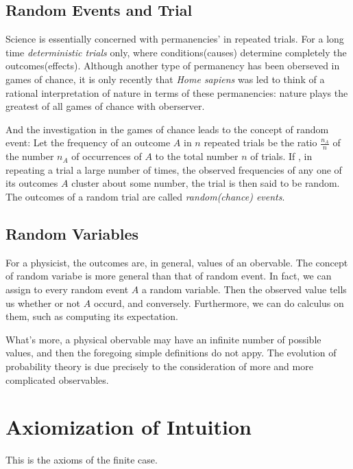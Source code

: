 \documentclass[a4paper]{book}
\begin{document}
	\subsection{Random Events and Trial}

	Science is essentially concerned with  permanencies' in repeated trials.
	For a long time \textit{deterministic trials} only, where
	conditions(causes) determine completely the outcomes(effects). Although
	another type of permanency has been oberseved in games of chance, it is
	only recently that \textit{Home sapiens} was led to think of a rational
	interpretation of nature in terms of these permanencies: nature plays
	the greatest of all games of chance with
	oberserver.\cite{1977probability}

	And the investigation in the games of chance leads to the concept of
	random event: Let the frequency of an outcome $A$ in $n$ repeated
	trials be the ratio $\frac{n_A}{n}$ of the number $n_A$ of occurrences
	of $A$ to the total number $n$ of trials. If , in repeating a trial a
	large number of times, the observed frequencies of any one of its
	outcomes $A$ cluster about some number, the trial is then said to be
	random. The outcomes of a random trial are called \textit{random(chance)
	events}.\cite{1977probability}

	\subsection{Random Variables}

	For a physicist, the outcomes are, in general, values of an obervable.
	The concept of random variabe is more general than that of random event.
	In fact, we can assign to every random event $A$ a random variable. Then
	the observed value tells us whether or not $A$ occurd, and conversely.
	Furthermore, we can do calculus on them, such as computing its
	expectation.\cite{1977probability}

	What's more, a physical obervable may have an infinite number of
	possible values, and then the foregoing simple definitions do not appy.
	The evolution of probability theory is due precisely to the
	consideration of more and more complicated
	observables.\cite{1977probability}

\section{Axiomization of Intuition}

	This is the axioms of the finite case.
\end{document}
